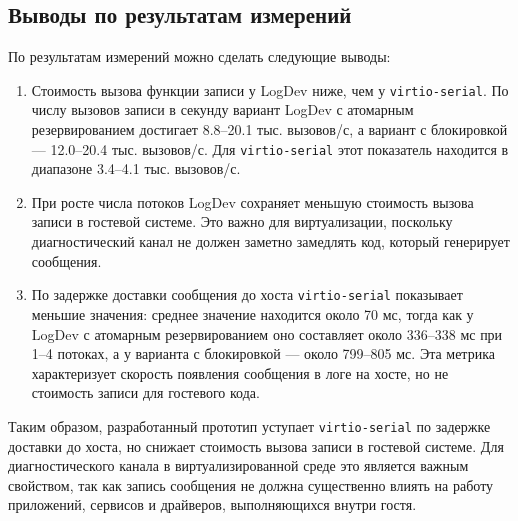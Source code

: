 \subsection{Выводы по результатам измерений}
\label{sec:ch5-expected}

По результатам измерений можно сделать следующие выводы:
\begin{enumerate}
    \item Стоимость вызова функции записи у LogDev ниже, чем у
    \texttt{virtio-serial}. По числу вызовов записи в секунду вариант LogDev с
    атомарным резервированием достигает 8.8--20.1 тыс. вызовов/с, а вариант с
    блокировкой --- 12.0--20.4 тыс. вызовов/с. Для \texttt{virtio-serial} этот
    показатель находится в диапазоне 3.4--4.1 тыс. вызовов/с.
    \item При росте числа потоков LogDev сохраняет меньшую стоимость вызова
    записи в гостевой системе. Это важно для виртуализации, поскольку
    диагностический канал не должен заметно замедлять код, который генерирует
    сообщения.
    \item По задержке доставки сообщения до хоста \texttt{virtio-serial}
    показывает меньшие значения: среднее значение находится около 70 мс, тогда
    как у LogDev с атомарным резервированием оно составляет около 336--338 мс
    при 1--4 потоках, а у варианта с блокировкой --- около 799--805 мс. Эта
    метрика характеризует скорость появления сообщения в
    логе на хосте, но не стоимость записи для гостевого кода.
\end{enumerate}

Таким образом, разработанный прототип уступает \texttt{virtio-serial} по
задержке доставки до хоста, но снижает стоимость вызова записи в гостевой
системе. Для диагностического канала в виртуализированной среде это является
важным свойством, так как запись сообщения не должна существенно влиять на
работу приложений, сервисов и драйверов, выполняющихся внутри гостя.
